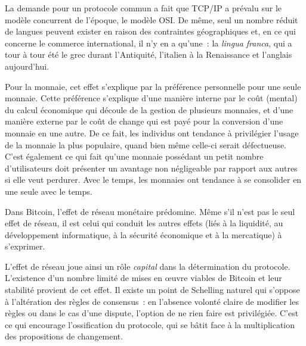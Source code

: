 La demande pour un protocole commun a fait que TCP/IP a prévalu sur le modèle concurrent de l'époque, le modèle OSI. De même, seul un nombre réduit de langues peuvent exister en raison des contraintes géographiques et, en ce qui concerne le commerce international, il n'y en a qu'une~: la \emph{lingua franca}, qui a tour à tour été le grec durant l'Antiquité, l'italien à la Renaissance et l'anglais aujourd'hui.

Pour la monnaie, cet effet s'explique par la préférence personnelle pour une seule monnaie. Cette préférence s'explique d'une manière interne par le coût (mental) du calcul économique qui découle de la gestion de plusieurs monnaies, et d'une manière externe par le coût de change qui est payé pour la conversion d'une monnaie en une autre. De ce fait, les individus ont tendance à privilégier l'usage de la monnaie la plus populaire, quand bien même celle-ci serait défectueuse. C'est également ce qui fait qu'une monnaie possédant un petit nombre d'utilisateurs doit présenter un avantage non négligeable par rapport aux autres si elle veut perdurer. Avec le temps, les monnaies ont tendance à se consolider en une seule avec le temps.

Dans Bitcoin, l'effet de réseau monétaire prédomine. Même s'il n'est pas le seul effet de réseau, il est celui qui conduit les autres effets (liés à la liquidité, au développement informatique, à la sécurité économique et à la mercatique) à s'exprimer.

L'effet de réseau joue ainsi un rôle \emph{capital} dans la détermination du protocole. L'existence d'un nombre limité de mises en œuvre viables de Bitcoin et leur stabilité provient de cet effet. Il existe un point de Schelling naturel qui s'oppose à l'altération des règles de consensus~: en l'absence volonté claire de modifier les règles ou dans le cas d'une dispute, l'option de ne rien faire est privilégiée. C'est ce qui encourage l'ossification du protocole, qui se bâtit face à la multiplication des propositions de changement. %

